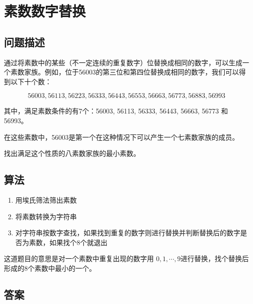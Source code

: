 \section{素数数字替换}
\subsection{问题描述}
\begin{tcolorbox}
	通过将素数中的某些（不一定连续的重复数字）位替换成相同的数字，可以生成一个素数家族。例如，位于56003的第三位和第四位替换成相同的数字，我们可以得到以下十个数：

	\[
		56003, 56113, 56223, 56333, 56443, 56553, 56663, 56773, 56883, 56993
	\]

	其中，满足素数条件的有7个：56003, 56113, 56333, 56443, 56663, 56773 和 56993。

	在这些素数中，56003是第一个在这种情况下可以产生一个七素数家族的成员。

	找出满足这个性质的八素数家族的最小素数。
\end{tcolorbox}

\subsection{算法}
\begin{enumerate}
	\item 用埃氏筛法筛出素数
	\item 将素数转换为字符串
	\item 对字符串按数字查找，如果找到重复的数字则进行替换并判断替换后的数字是否为素数，如果找个8个就退出
\end{enumerate}

这道题目的意思是对一个素数中重复出现的数字用 \( 0,1,\cdots, 9 \)进行替换，找个替换后形成的8个素数中最小的一个。

\subsection{答案}
